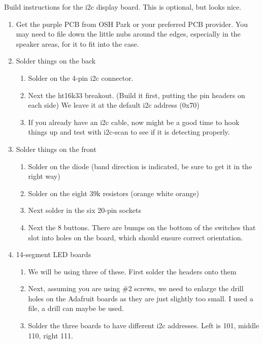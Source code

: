 \documentclass[11pt]{article}
\begin{document}
Build instructions for the i2c display board.
This is optional, but looks nice.


\begin{enumerate}
\item	Get the purple PCB from OSH Park or your preferred PCB provider.
	You may need to file down the little nubs around the edges, especially in the 
	speaker areas, for it to fit into the case.

\item Solder things on the back
	\begin{enumerate}
		\item	Solder on the 4-pin i2c connector.
		\item	Next the ht16k33 breakout.  (Build it first, putting the pin
			headers on each side)  We leave it at the default i2c address (0x70)
		\item	If you already have an i2c cable, now might be a good time to hook 
			things up and test with i2c-scan to see if it is detecting properly.
	\end{enumerate}

\item Solder things on the front
	\begin{enumerate}
	\item	Solder on the diode (band direction is indicated, be sure to get it in
		the right way)
	\item	Solder on the eight 39k resistors (orange white orange)
	\item	Next solder in the six 20-pin sockets
	\item	Next the 8 buttons.
		There are bumps on the bottom of the
		switches that slot into holes on the board, which should
		ensure correct orientation.
	\end{enumerate}

\item 14-segment LED boards

	\begin{enumerate}

		\item	We will be using three of these.
			First solder the headers onto them

		\item  Next, assuming you are using \#2 screws, we need to enlarge the
			drill holes on the Adafruit boards as they are just slightly too
			small.  I used a file, a drill can maybe be used.

		\item Solder the three boards to have different i2c addresses.
			Left is 101, middle 110, right 111.


\end{enumerate}
\end{enumerate}
\end{document}
